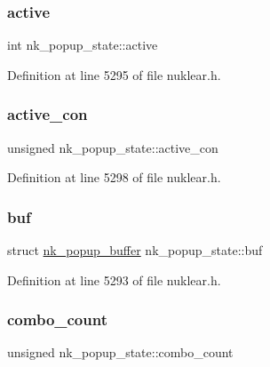 \subsubsection{\texorpdfstring{active}{active}}
{\footnotesize\ttfamily int nk\+\_\+popup\+\_\+state\+::active}



Definition at line 5295 of file nuklear.\+h.

\mbox{\label{structnk__popup__state_af670e7c6e45a92e369dc54e7b7321f78}} 
\subsubsection{\texorpdfstring{active\+\_\+con}{active\_con}}
{\footnotesize\ttfamily unsigned nk\+\_\+popup\+\_\+state\+::active\+\_\+con}



Definition at line 5298 of file nuklear.\+h.

\mbox{\label{structnk__popup__state_a74261b023275e19b075c6db1dab8905b}} 
\subsubsection{\texorpdfstring{buf}{buf}}
{\footnotesize\ttfamily struct \mbox{\hyperlink{structnk__popup__buffer}{nk\+\_\+popup\+\_\+buffer}} nk\+\_\+popup\+\_\+state\+::buf}



Definition at line 5293 of file nuklear.\+h.

\mbox{\label{structnk__popup__state_aa3c1aaa75caa20b7bb8b2506aceb45ab}} 
\subsubsection{\texorpdfstring{combo\+\_\+count}{combo\_count}}
{\footnotesize\ttfamily unsigned nk\+\_\+popup\+\_\+state\+::combo\+\_\+count}



